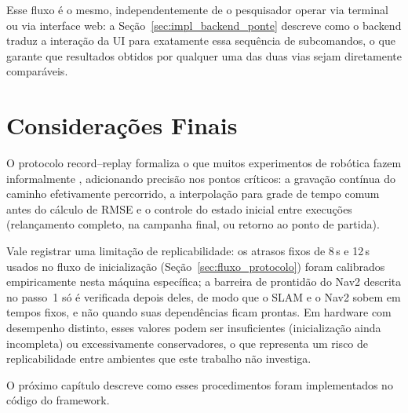 Esse fluxo é o mesmo, independentemente de o pesquisador operar via terminal ou
via interface web: a Seção~\ref{sec:impl_backend_ponte} descreve como o backend
traduz a interação da UI para exatamente essa sequência de subcomandos, o que
garante que resultados obtidos por qualquer uma das duas vias sejam diretamente
comparáveis.

\section{Considerações Finais}
\label{sec:met_conclusao}

O protocolo record--replay formaliza o que muitos experimentos de robótica fazem
informalmente \cite{amigoni2014}, adicionando precisão nos pontos críticos: a gravação contínua do caminho
efetivamente percorrido, a interpolação para
grade de tempo comum antes do cálculo de RMSE e o controle do estado inicial
entre execuções (relançamento completo, na campanha final, ou retorno ao ponto
de partida).

Vale registrar uma limitação de replicabilidade: os atrasos fixos de 8\,s e
12\,s usados no fluxo de inicialização (Seção~\ref{sec:fluxo_protocolo}) foram
calibrados empiricamente nesta máquina específica; a barreira de prontidão do
Nav2 descrita no passo~1 só é verificada depois deles, de modo que o SLAM e o
Nav2 sobem em tempos fixos, e não quando suas dependências ficam prontas.
Em hardware com desempenho distinto, esses valores podem ser insuficientes
(inicialização ainda incompleta) ou excessivamente conservadores, o que
representa um risco de replicabilidade entre ambientes que este trabalho não
investiga.

O próximo capítulo descreve como esses procedimentos foram
implementados no código do framework.
